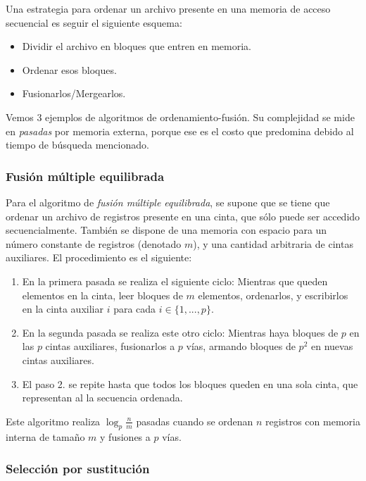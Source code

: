 \documentclass{article}
\begin{document}
Una estrategia para ordenar un archivo presente en una memoria de acceso secuencial es seguir el siguiente esquema:
\begin{itemize}
    \item Dividir el archivo en bloques que entren en memoria.
    \item Ordenar esos bloques.
    \item Fusionarlos/Mergearlos.
\end{itemize}

Vemos 3 ejemplos de algoritmos de ordenamiento-fusión. Su complejidad se mide en \textit{pasadas} por memoria externa, porque ese es el costo que predomina debido al tiempo de búsqueda mencionado.

\subsubsection{Fusión múltiple equilibrada}

Para el algoritmo de \textit{fusión múltiple equilibrada}, se supone que se tiene que ordenar un archivo de registros presente en una cinta, que sólo puede ser accedido secuencialmente. También se dispone de una memoria con espacio para un número constante de registros (denotado $m$), y una cantidad arbitraria de cintas auxiliares. El procedimiento es el siguiente:
\begin{enumerate}
    \item En la primera pasada se realiza el siguiente ciclo: Mientras que queden elementos en la cinta, leer bloques de $m$ elementos, ordenarlos, y escribirlos en la cinta auxiliar $i$ para cada $i \in \{1, ..., p\}$.
    \item En la segunda pasada se realiza este otro ciclo: Mientras haya bloques de $p$ en las $p$ cintas auxiliares, fusionarlos a $p$ vías, armando bloques de $p^2$ en nuevas cintas auxiliares.
    \item El paso 2. se repite hasta que todos los bloques queden en una sola cinta, que representan al la secuencia ordenada.
\end{enumerate}

Este algoritmo realiza $\log_p{\frac{n}{m}}$ pasadas cuando se ordenan $n$ registros con memoria interna de tamaño $m$ y fusiones a $p$ vías.

\subsubsection{Selección por sustitución}
\end{document}
